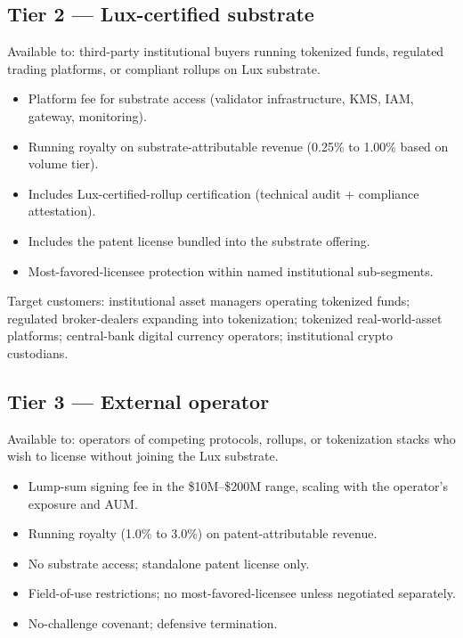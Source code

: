 \documentclass[11pt,letterpaper]{article}
\begin{document}
\subsection{Tier 2 --- Lux-certified substrate}

Available to: third-party institutional buyers running tokenized funds, regulated trading platforms, or compliant rollups on Lux substrate.

\begin{itemize}
\item Platform fee for substrate access (validator infrastructure, KMS, IAM, gateway, monitoring).
\item Running royalty on substrate-attributable revenue (0.25\% to 1.00\% based on volume tier).
\item Includes Lux-certified-rollup certification (technical audit + compliance attestation).
\item Includes the patent license bundled into the substrate offering.
\item Most-favored-licensee protection within named institutional sub-segments.
\end{itemize}

Target customers: institutional asset managers operating tokenized funds; regulated broker-dealers expanding into tokenization; tokenized real-world-asset platforms; central-bank digital currency operators; institutional crypto custodians.

\subsection{Tier 3 --- External operator}

Available to: operators of competing protocols, rollups, or tokenization stacks who wish to license without joining the Lux substrate.

\begin{itemize}
\item Lump-sum signing fee in the \$10M--\$200M range, scaling with the operator's exposure and AUM.
\item Running royalty (1.0\% to 3.0\%) on patent-attributable revenue.
\item No substrate access; standalone patent license only.
\item Field-of-use restrictions; no most-favored-licensee unless negotiated separately.
\item No-challenge covenant; defensive termination.
\end{itemize}
\end{document}
